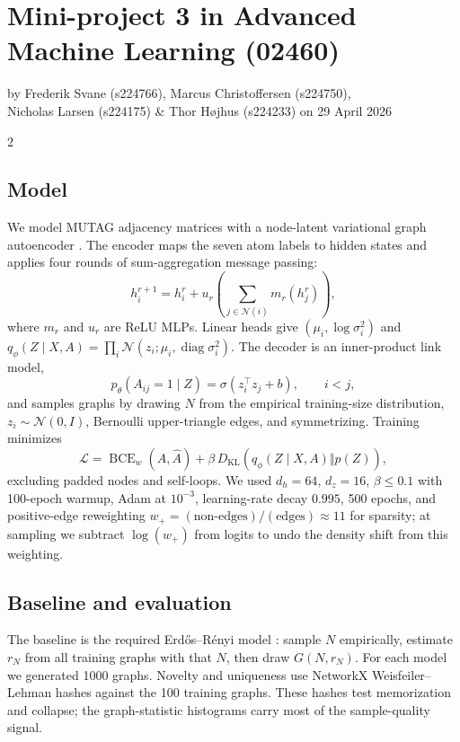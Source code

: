 \documentclass[10pt,a4paper]{article}
\begin{document}

\section*{Mini-project 3 in Advanced Machine Learning (02460)}
by Frederik Svane (s224766), Marcus Christoffersen (s224750), \\
Nicholas Larsen (s224175) \& Thor H{\o}jhus (s224233) on 29 April 2026

\begin{multicols}{2}
\subsection*{Model}
We model MUTAG adjacency matrices \citep{debnath1991mutag} with a node-latent variational graph autoencoder \citep{kingma2014vae,kipf2016vgae}. The encoder maps the seven atom labels to hidden states and applies four rounds of sum-aggregation message passing:
\[
h_i^{r+1}=h_i^r+u_r\!\left(\sum_{j\in\mathcal N(i)} m_r(h_j^r)\right),
\]
where $m_r$ and $u_r$ are ReLU MLPs. Linear heads give $(\mu_i,\log\sigma_i^2)$ and $q_\phi(Z\mid X,A)=\prod_i \mathcal N(z_i;\mu_i,\operatorname{diag}\sigma_i^2)$. The decoder is an inner-product link model,
\[
p_\theta(A_{ij}=1\mid Z)=\sigma(z_i^\top z_j+b),\qquad i<j,
\]
and samples graphs by drawing $N$ from the empirical training-size distribution, $z_i\sim\mathcal N(0,I)$, Bernoulli upper-triangle edges, and symmetrizing. Training minimizes
\[
\mathcal L=\operatorname{BCE}_w(A,\hat A)+\beta\,D_{\mathrm{KL}}(q_\phi(Z\mid X,A)\Vert p(Z)),
\]
excluding padded nodes and self-loops. We used $d_h=64$, $d_z=16$, $\beta\leq0.1$ with 100-epoch warmup, Adam at $10^{-3}$, learning-rate decay $0.995$, 500 epochs, and positive-edge reweighting $w_+ = (\text{non-edges})/(\text{edges}) \approx 11$ for sparsity; at sampling we subtract $\log(w_+)$ from logits to undo the density shift from this weighting.

\subsection*{Baseline and evaluation}
The baseline is the required Erd\H{o}s--R\'enyi model \citep{erdos1959random}: sample $N$ empirically, estimate $r_N$ from all training graphs with that $N$, then draw $G(N,r_N)$. For each model we generated 1000 graphs. Novelty and uniqueness use NetworkX Weisfeiler--Lehman hashes \citep{shervashidze2011wl} against the 100 training graphs. These hashes test memorization and collapse; the graph-statistic histograms carry most of the sample-quality signal.


\end{multicols}
\end{document}
